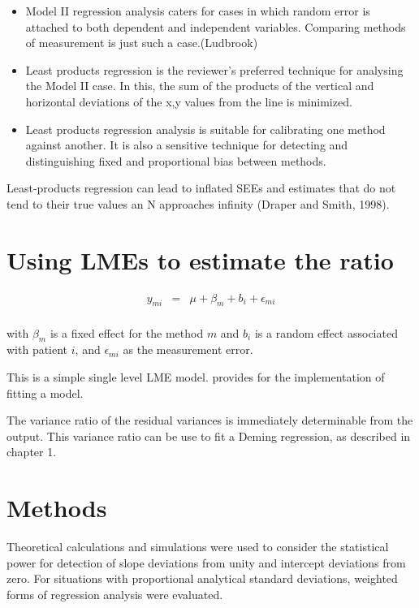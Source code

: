 \documentclass[12pt, a4paper]{report}
\theoremstyle{plain}
\theoremstyle{definition}
\theoremstyle{remark}
\begin{document}
\begin{itemize}
	\item Model II regression analysis caters for cases in which random error is attached to both dependent and independent variables. Comparing methods of measurement is just such a case.(Ludbrook)
	
	\item Least products regression is the reviewer's preferred technique for analysing the Model II case. In this, the sum of the products of the vertical and horizontal deviations of the x,y values from the line is minimized.
	
	\item Least products regression analysis is suitable for calibrating one method against another. It is also a sensitive technique for detecting and distinguishing fixed and proportional bias between
	methods.
\end{itemize}

Least-products regression can lead to inflated SEEs and estimates that do not tend to their true values an N approaches infinity (Draper and Smith, 1998).









\section{Using LMEs to estimate the ratio}

\begin{eqnarray*}
	y_{mi} &=& \mu + \beta_{m} + b_{i} + \epsilon_{mi}\\
\end{eqnarray*}

with $\beta_{m}$ is a fixed effect for the method $m$ and $b_{i}$
is a random effect associated with patient $i$, and
$\epsilon_{mi}$ as the measurement error.

This is a simple single level LME model. \citet{pb} provides for
the implementation of fitting a model.

The variance ratio of the residual variances is immediately
determinable from the output. This variance ratio can be use to
fit a Deming regression, as described in chapter 1.






\section{Methods} 
Theoretical calculations and simulations were used to consider the statistical power for detection of slope deviations from 
unity and intercept deviations from zero. For situations with proportional analytical standard deviations, weighted forms of regression analysis were evaluated.
\end{document}
